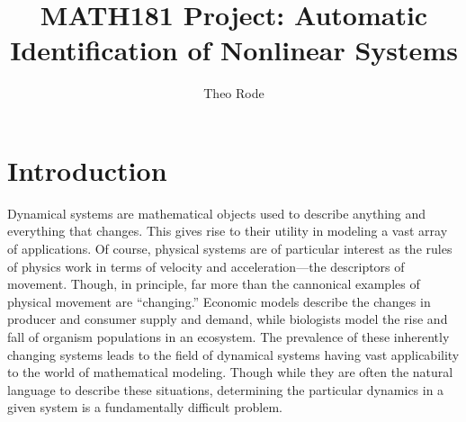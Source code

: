 \documentclass[10pt]{paper}
\begin{document}
\title{MATH181 Project: Automatic Identification of Nonlinear Systems}
\author{Theo Rode}



\maketitle

\section{Introduction} \label{sec:introduction}
Dynamical systems are mathematical objects used to describe anything and everything that changes. This gives rise to their utility in modeling a vast array of applications. Of course, physical systems are of particular interest as the rules of physics work in terms of velocity and acceleration---the descriptors of movement. 
Though, in principle, far more than the cannonical examples of physical movement are ``changing.'' Economic models describe the changes in producer and consumer supply and demand, while biologists model the rise and fall of organism populations in an ecosystem. 
The prevalence of these inherently changing systems leads to the field of dynamical systems having vast applicability to the world of mathematical modeling. Though while they are often the natural language to describe these situations, determining the particular dynamics in a given system is a fundamentally difficult problem. 
\end{document}
